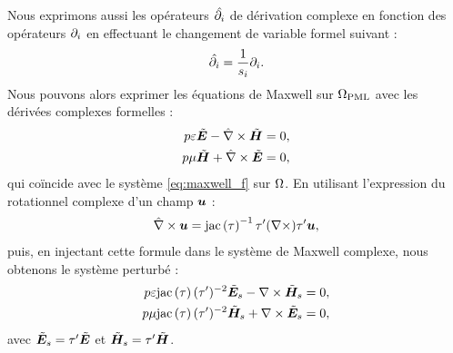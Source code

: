 Nous exprimons aussi les opérateurs $\hat{\partial_{i}}$
de dérivation complexe en fonction des opérateurs $\partial_{i}$
en effectuant le changement de variable formel suivant :
\begin{align}
	\hat{\partial_{i}} = \frac{1}{s_i} \partial_{i} .
\end{align}
Nous pouvons alors exprimer les équations de Maxwell sur
$\Omega_{\mathrm{PML}}$ avec les dérivées complexes formelles :
\begin{subequations} \label{eq:maxwell_f_c}
	\begin{align}
		p \varepsilon \tilde{\bm{E}} - \hat{\nabla}\times \tilde{\bm{H}} &= 0 , \\
		p \mu \tilde{\bm{H}} + \hat{\nabla}\times \tilde{\bm{E}} &= 0 ,
	\end{align}
\end{subequations}
qui coïncide avec le système \eqref{eq:maxwell_f} sur $\Omega$.
En utilisant l’expression du rotationnel complexe d’un champ $\bm{u}$ :
\begin{align}
	\hat{\nabla}\times \bm{u} =
	\mathrm{jac}\left(\tau\right)^{-1} \tau' (\nabla\times) \tau' \bm{u} ,
\end{align}
puis, en injectant cette formule dans le système de Maxwell complexe,
nous obtenons le système perturbé :
\begin{subequations} \label{eq:maxwell_f_p}
	\begin{align}
		p \varepsilon \mathrm{jac}\left(\tau\right) (\tau')^{-2} \tilde{\bm{E}}_s - \nabla\times \tilde{\bm{H}}_s &= 0 , \\
		p \mu \mathrm{jac}\left(\tau\right) (\tau')^{-2} \tilde{\bm{H}}_s + \nabla\times \tilde{\bm{E}}_s &= 0 ,
	\end{align}
\end{subequations}
avec $\tilde{\bm{E}}_s = \tau' \tilde{\bm{E}}$ et $\tilde{\bm{H}}_s = \tau' \tilde{\bm{H}}$.

